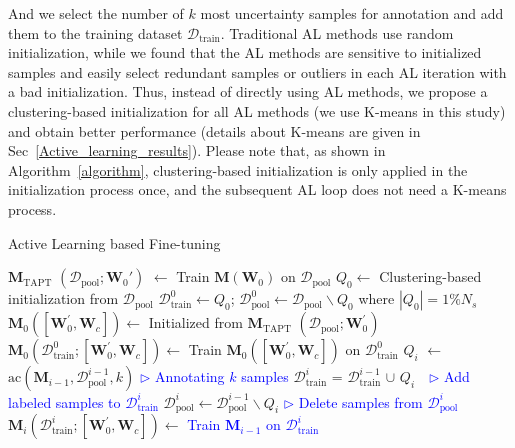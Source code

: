 \documentclass{article}
\begin{document}
And we select the number of $k$ most uncertainty samples for annotation and add them to the training dataset $\mathcal{D}_{\textrm{train}}$. Traditional AL methods use random initialization, while we found that the AL methods are sensitive to initialized samples and easily select redundant samples or outliers in each AL iteration with a bad initialization. Thus, instead of directly using AL methods, we propose a clustering-based initialization for all AL methods (we use K-means in this study) and obtain better performance (details about K-means are given in Sec~\ref{Active_learning_results}). Please note that, as shown in Algorithm~\ref{algorithm}, clustering-based initialization is only applied in the initialization process once, and the subsequent AL loop does not need a K-means process.
%




\begin{algorithm}
\small
{}
\caption{Active Learning based Fine-tuning}
\label{algorithm}
$\mathbf{M}_{\textrm{TAPT}}$ $(\mathcal{D}_{\textrm{pool}}; \mathbf{W}_{0}')$ $\leftarrow$ Train $\mathbf{M}(\mathbf{W}_{0})$ on $\mathcal{D}_{\textrm{pool}}$\;
%
$Q_{0} \leftarrow$ Clustering-based initialization from $\mathcal{D}_{\textrm{pool}}$\;
%
$\mathcal{D}_{\textrm{train}}^{0} \leftarrow Q_{0}$;
$\mathcal{D}_{\textrm{pool}}^{0} \leftarrow \mathcal{D}_{\textrm{pool}} \backslash Q_{0}$ where $|Q_{0}|=1\%N_{s}$\;
$\mathbf{M}_{0}([\mathbf{W}_{0}^{'},\mathbf{W}_{c}]) \leftarrow$ Initialized from $\mathbf{M}_{\textrm{TAPT}}$ $(\mathcal{D}_{\textrm{pool}}; \mathbf{W}_{0}^{'})$\;
%
$\mathbf{M}_{0}(\mathcal{D}_{\textrm{train}}^{0}; [\mathbf{W}_{0}^{'}, \mathbf{W}_{c}]) \leftarrow$ Train $\mathbf{M}_{0}([\mathbf{W}_{0}^{'}, \mathbf{W}_{c}])$ on $\mathcal{D}_{\textrm{train}}^{0}$\;
%
{$Q_{i}$ $\leftarrow$
$\mbox{ac}(\mathbf{M}_{i-1},\mathcal{D}_{\textrm{pool}}^{i-1},k)$ 
\quad \textcolor{blue}{$\triangleright$} \textcolor{blue}{Annotating $k$ samples}\;
$\mathcal{D}_{\textrm{train}}^{i}$\,\,=\,\,$\mathcal{D}_{\textrm{train}}^{i-1}$ $\cup$ $Q_{i}$  \,\, \textcolor{blue}{$\triangleright$} \textcolor{blue}{Add labeled samples to $\mathcal{D}_{\textrm{train}}^{i}$}\;
$\mathcal{D}_{\textrm{pool}}^{i} \leftarrow \mathcal{D}_{\textrm{pool}}^{i-1} \backslash Q_{i}$ \quad \textcolor{blue}{$\triangleright$} \textcolor{blue}{Delete samples from $\mathcal{D}_{\textrm{pool}}^{i}$}\;
$\mathbf{M}_{i}(\mathcal{D}_{\textrm{train}}^{i}; [\mathbf{W}_{0}^{'}, \mathbf{W}_{c}]) \leftarrow$ \textcolor{blue}{Train  $\mathbf{M}_{i-1}$ on $\mathcal{D}_{\textrm{train}}^{i}$}\; }
\end{algorithm}
\end{document}
